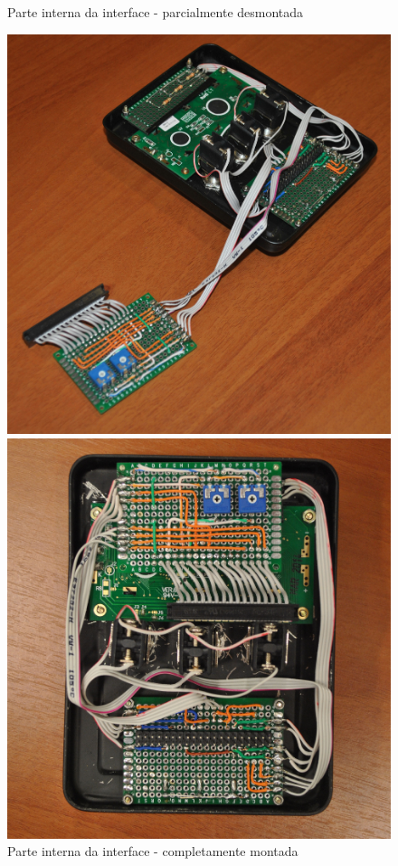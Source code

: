 \documentclass[
		12pt,				%
		openright,			%
		oneside,			%
		a4paper,			%
		chapter=TITLE,		%
		english,			%
		brazil				%
	]{abntex2}
\begin{document}
\begin{figure}[htb]
	\centering
 	\begin{minipage}{0.45\textwidth}
		\centering
		\caption{\label{fig:interface-traz1}Parte interna da interface - parcialmente desmontada}
		\includegraphics[width=1\textwidth]{img/interface-traz1.jpg}
	\end{minipage}
	\hfill
	\begin{minipage}{0.45\textwidth}
		\centering
		\caption{\label{fig:interface-traz2}Parte interna da interface - completamente montada}
		\includegraphics[width=1\textwidth]{img/interface-traz2.jpg}
	\end{minipage}
\end{figure}
\end{document}
